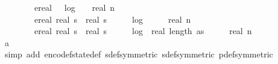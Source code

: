 \begin{isabellebody}
\ \ \ \ \ \ \ {\isacharplus}{\kern0pt}\ {\isacharparenleft}{\kern0pt}ereal\ {\isacharparenleft}{\kern0pt}{}\ {\isacharasterisk}{\kern0pt}\ {\isacharparenleft}{\kern0pt}log\ {}\ {\isacharparenleft}{\kern0pt}{}\ {\isacharplus}{\kern0pt}\ real\ {\isacharparenleft}{\kern0pt}{}{\isacharasterisk}{\kern0pt}n{\isacharplus}{\kern0pt}{}{\isacharparenright}{\kern0pt}{\isacharparenright}{\kern0pt}{\isacharparenright}{\kern0pt}\ {\isacharplus}{\kern0pt}\ {}{\isacharparenright}{\kern0pt}\ \isanewline
\ \ \ \ \ \ \ {\isacharplus}{\kern0pt}\ {\isacharparenleft}{\kern0pt}{\isacharparenleft}{\kern0pt}ereal\ {\isacharparenleft}{\kern0pt}real\ s\ {\isacharasterisk}{\kern0pt}\ real\ s\ {\isacharasterisk}{\kern0pt}\ {\isacharparenleft}{\kern0pt}{}{}\ {\isacharplus}{\kern0pt}\ {}\ {\isacharasterisk}{\kern0pt}\ log\ {}\ {\isacharparenleft}{\kern0pt}{}\ {\isacharplus}{\kern0pt}\ {}\ {\isacharasterisk}{\kern0pt}\ real\ n{\isacharparenright}{\kern0pt}{\isacharparenright}{\kern0pt}\ {\isacharplus}{\kern0pt}\ {}{\isacharparenright}{\kern0pt}\ \isanewline
\ \ \ \ \ \ \ {\isacharplus}{\kern0pt}\ {\isacharparenleft}{\kern0pt}ereal\ {\isacharparenleft}{\kern0pt}real\ s\ {\isacharasterisk}{\kern0pt}\ real\ s\ {\isacharasterisk}{\kern0pt}\ {\isacharparenleft}{\kern0pt}{}\ {\isacharplus}{\kern0pt}\ {}\ {\isacharasterisk}{\kern0pt}\ log\ {}\ {\isacharparenleft}{\kern0pt}real\ {\isacharparenleft}{\kern0pt}length\ as{\isacharparenright}{\kern0pt}\ {\isacharasterisk}{\kern0pt}\ {\isacharparenleft}{\kern0pt}{}\ {\isacharplus}{\kern0pt}\ {}\ {\isacharasterisk}{\kern0pt}\ real\ n{\isacharparenright}{\kern0pt}\ {\isacharplus}{\kern0pt}\ {}{\isacharparenright}{\kern0pt}\ {\isacharparenright}{\kern0pt}\ {\isacharplus}{\kern0pt}\ {}{\isacharparenright}{\kern0pt}{\isacharparenright}{\kern0pt}{\isacharparenright}{\kern0pt}{\isacharparenright}{\kern0pt}{\isachardoublequoteclose}\isanewline
\ \ \ \ \ \ \isamarkupfalse%
\ a{\isacharunderscore}{\kern0pt}{}\isanewline
\ \ \ \ \ \ \isamarkupfalse%
\ {\isacharparenleft}{\kern0pt}simp\ add{\isacharcolon}{\kern0pt}\ encode{\isacharunderscore}{\kern0pt}f{}{\isacharunderscore}{\kern0pt}state{\isacharunderscore}{\kern0pt}def\ sdef{\isacharbrackleft}{\kern0pt}symmetric{\isacharbrackright}{\kern0pt}\ sdef{\isacharbrackleft}{\kern0pt}symmetric{\isacharbrackright}{\kern0pt}\ p{\isacharunderscore}{\kern0pt}def{\isacharbrackleft}{\kern0pt}symmetric{\isacharbrackright}{\kern0pt}\ \isanewline

\end{isabellebody}
